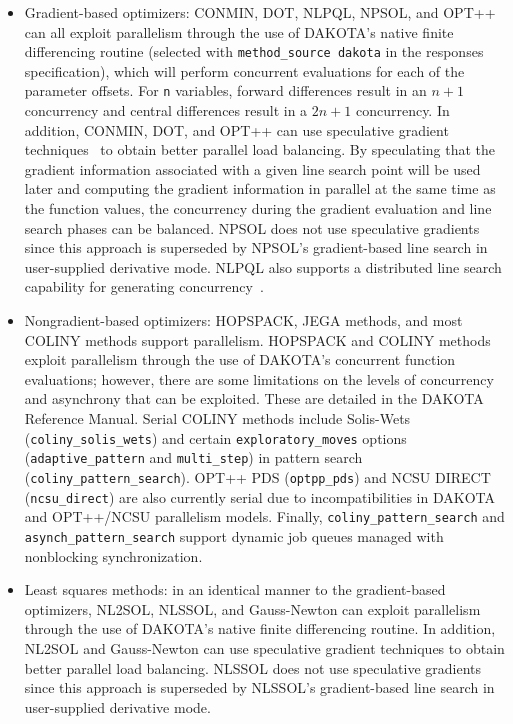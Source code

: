 \begin{itemize}
\item Gradient-based optimizers: CONMIN, DOT, NLPQL, NPSOL, and OPT++
  can all exploit parallelism through the use of DAKOTA's native finite
  differencing routine (selected with \texttt{method\_source dakota}
  in the responses specification), which will perform concurrent
  evaluations for each of the parameter offsets. For \texttt{n}
  variables, forward differences result in an $n+1$ concurrency and
  central differences result in a $2n+1$ concurrency. In addition,
  CONMIN, DOT, and OPT++ can use speculative gradient
  techniques~\cite{Byr88} to obtain better parallel load balancing. By
  speculating that the gradient information associated with a given
  line search point will be used later and computing the gradient
  information in parallel at the same time as the function values, the
  concurrency during the gradient evaluation and line search phases
  can be balanced. NPSOL does not use speculative gradients since this
  approach is superseded by NPSOL's gradient-based line search in
  user-supplied derivative mode.  NLPQL also supports a distributed
  line search capability for generating concurrency~\cite{Sch04}.

\item Nongradient-based optimizers: HOPSPACK, JEGA methods, and most
  COLINY methods support parallelism.  HOPSPACK and COLINY methods
  exploit parallelism through the use of DAKOTA's concurrent function
  evaluations; however, there are some limitations on the levels of
  concurrency and asynchrony that can be exploited.  These are detailed
  in the DAKOTA Reference Manual. Serial COLINY methods include
  Solis-Wets (\texttt{coliny\_solis\_wets}) and certain
  \texttt{exploratory\_moves} options (\texttt{adaptive\_pattern} and
  \texttt{multi\_step}) in pattern search
  (\texttt{coliny\_pattern\_search}).  OPT++ PDS (\texttt{optpp\_pds})
  and NCSU DIRECT (\texttt{ncsu\_direct}) are also currently serial
  due to incompatibilities in DAKOTA and OPT++/NCSU parallelism
  models.  Finally, \texttt{coliny\_pattern\_search} and
  \texttt{asynch\_pattern\_search} support dynamic job queues managed
  with nonblocking synchronization.

\item Least squares methods: in an identical manner to the
  gradient-based optimizers, NL2SOL, NLSSOL, and Gauss-Newton can
  exploit parallelism through the use of DAKOTA's native finite
  differencing routine. In addition, NL2SOL and Gauss-Newton can use
  speculative gradient techniques to obtain better parallel load
  balancing. NLSSOL does not use speculative gradients since this
  approach is superseded by NLSSOL's gradient-based line search in
  user-supplied derivative mode.


\end{itemize}
